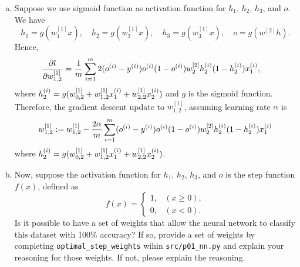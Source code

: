 \documentclass[12pt,letterpaper,boxed]{hmcpset}
\begin{document}
\begin{solution}
\begin{enumerate}[(a)]
  \item Suppose we use sigmoid function as activation function for $h_1$, $h_2$, $h_3$, and $o$. We have
  \[
    h_1 = g(w_1^{[1]} x), \quad h_2 = g(w_2^{[1]} x), \quad h_3 = g(w_3^{[1]} x), \quad o = g(w^{[2]} h).
  \]
  Hence, 
  \[
  \begin{aligned}
    \pdv{l}{w_{1,2}^{[1]}} &= 
      \frac{1}{m} \sum_{i=1}^{m} 2 (\oo-\yy) \oo (1-\oo) w_2^{[2]} \hh_2 (1-\hh_2) \xx_1,
  \end{aligned}
  \]
  where $\hh_2 = g(w_{0,2}^{[1]} + w_{1,2}^{[1]} \xx_1 + w_{2,2}^{[1]} \xx_2)$ and $g$ is the sigmoid function.
  Therefore, the gradient descent update to $w_{1,2}^{[1]}$, assuming learning rate $\alpha$ is
  \[
    w_{1,2}^{[1]} := w_{1,2}^{[1]} - \frac{2 \alpha}{m} \sum_{i=1}^{m} (\oo-\yy) \oo (1-\oo) w_2^{[2]} \hh_2 (1-\hh_2) \xx_1
  \]
  where $\hh_2 = g(w_{0,2}^{[1]} + w_{1,2}^{[1]} \xx_1 + w_{2,2}^{[1]} \xx_2 )$.

  \item Now, suppose the activation function for $h_1$, $h_2$, $h_3$, and $o$ is the step function $f(x)$, defined as
  \[
    f(x) = \begin{cases}
      1, & (x \geq 0), \\
      0, & (x < 0).
    \end{cases}
  \]
  Is it possible to have a set of weights that allow the neural network to classify this dataset with 100\% accuracy? If so, provide a set of weights by completing \verb|optimal_step_weights| wihin \verb|src/p01_nn.py| and explain your reasoning for those weights. If not, please explain the reasoning.


\end{enumerate}
\end{solution}
\end{document}
